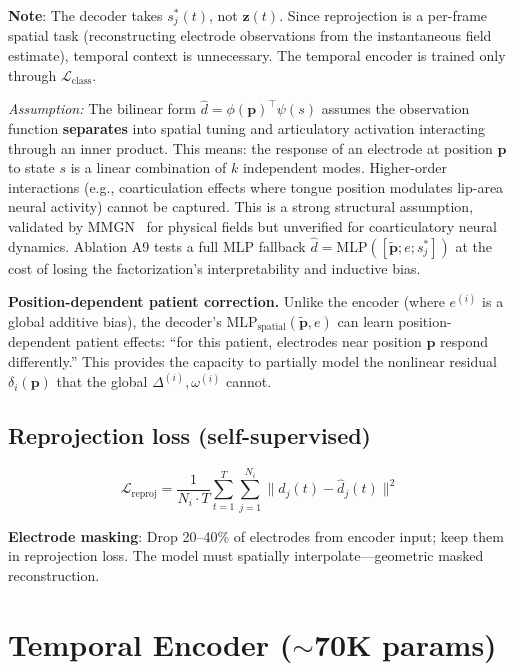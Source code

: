 \documentclass[11pt,letterpaper]{article}
\newcommand{\assumption}[1]{\par\smallskip\noindent\textcolor{BrickRed}{\textit{Assumption:} #1}\smallskip}
\newcommand{\bfp}{\mathbf{p}}
\newcommand{\bfz}{\mathbf{z}}
\begin{document}
\textbf{Note}: The decoder takes $s_j^*(t)$, not $\bfz(t)$. Since reprojection is a per-frame spatial task (reconstructing electrode observations from the instantaneous field estimate), temporal context is unnecessary. The temporal encoder is trained only through $\mathcal{L}_{\text{class}}$.

\assumption{The bilinear form $\hat{d} = \phi(\bfp)^\top \psi(s)$ assumes the observation function \textbf{separates} into spatial tuning and articulatory activation interacting through an inner product. This means: the response of an electrode at position $\bfp$ to state $s$ is a linear combination of $k$ independent modes. Higher-order interactions (e.g., coarticulation effects where tongue position modulates lip-area neural activity) cannot be captured. This is a strong structural assumption, validated by MMGN~\cite{xiong2024} for physical fields but unverified for coarticulatory neural dynamics. Ablation A9 tests a full MLP fallback $\hat{d} = \text{MLP}([\tilde{\bfp}; e; s_j^*])$ at the cost of losing the factorization's interpretability and inductive bias.}

\textbf{Position-dependent patient correction.} Unlike the encoder (where $e^{(i)}$ is a global additive bias), the decoder's $\text{MLP}_{\text{spatial}}(\tilde{\bfp}, e)$ can learn position-dependent patient effects: ``for this patient, electrodes near position $\bfp$ respond differently.'' This provides the capacity to partially model the nonlinear residual $\delta_i(\bfp)$ that the global $\Delta^{(i)}, \omega^{(i)}$ cannot.

\subsection{Reprojection loss (self-supervised)}
\begin{equation}\label{eq:reproj}
\mathcal{L}_{\text{reproj}} = \frac{1}{N_i \cdot T} \sum_{t=1}^{T} \sum_{j=1}^{N_i} \bigl\| d_j(t) - \hat{d}_j(t) \bigr\|^2
\end{equation}

\textbf{Electrode masking}: Drop 20--40\% of electrodes from encoder input; keep them in reprojection loss. The model must spatially interpolate---geometric masked reconstruction.


\section{Temporal Encoder (\texorpdfstring{${\sim}$70K}{~70K} params)}\label{sec:temporal}
\end{document}
